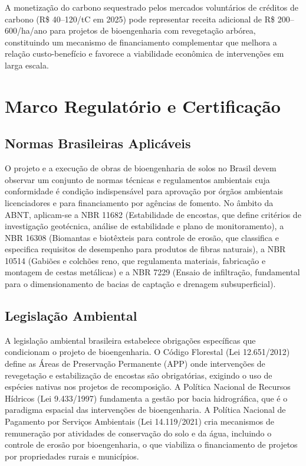 \documentclass[
  portuguese,
  11pt,
  a4paper,
  open=any]{scrbook}
\begin{document}
A monetização do carbono sequestrado pelos mercados voluntários de
créditos de carbono (R\$ 40--120/tC em 2025) pode representar receita
adicional de R\$ 200--600/ha/ano para projetos de bioengenharia com
revegetação arbórea, constituindo um mecanismo de financiamento
complementar que melhora a relação custo-benefício e favorece a
viabilidade econômica de intervenções em larga escala.

\section{Marco Regulatório e
Certificação}\label{marco-regulatuxf3rio-e-certificauxe7uxe3o}

\subsection{Normas Brasileiras
Aplicáveis}\label{normas-brasileiras-aplicuxe1veis}

O projeto e a execução de obras de bioengenharia de solos no Brasil
devem observar um conjunto de normas técnicas e regulamentos ambientais
cuja conformidade é condição indispensável para aprovação por órgãos
ambientais licenciadores e para financiamento por agências de fomento.
No âmbito da ABNT, aplicam-se a NBR 11682 (Estabilidade de encostas, que
define critérios de investigação geotécnica, análise de estabilidade e
plano de monitoramento), a NBR 16308 (Biomantas e biotêxteis para
controle de erosão, que classifica e especifica requisitos de desempenho
para produtos de fibras naturais), a NBR 10514 (Gabiões e colchões reno,
que regulamenta materiais, fabricação e montagem de cestas metálicas) e
a NBR 7229 (Ensaio de infiltração, fundamental para o dimensionamento de
bacias de captação e drenagem subsuperficial).

\subsection{Legislação Ambiental}\label{legislauxe7uxe3o-ambiental}

A legislação ambiental brasileira estabelece obrigações específicas que
condicionam o projeto de bioengenharia. O Código Florestal (Lei
12.651/2012) define as Áreas de Preservação Permanente (APP) onde
intervenções de revegetação e estabilização de encostas são
obrigatórias, exigindo o uso de espécies nativas nos projetos de
recomposição. A Política Nacional de Recursos Hídricos (Lei 9.433/1997)
fundamenta a gestão por bacia hidrográfica, que é o paradigma espacial
das intervenções de bioengenharia. A Política Nacional de Pagamento por
Serviços Ambientais (Lei 14.119/2021) cria mecanismos de remuneração por
atividades de conservação do solo e da água, incluindo o controle de
erosão por bioengenharia, o que viabiliza o financiamento de projetos
por propriedades rurais e municípios.
\end{document}
